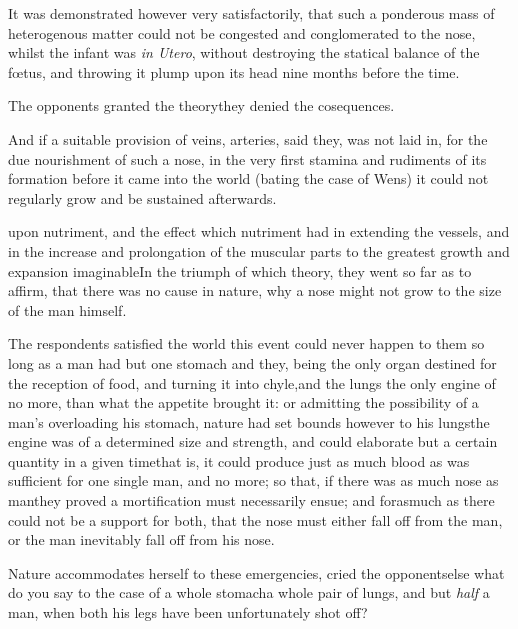 \documentclass{article}
\begin{document}
It was demonstrated however very sa\-tisfactorily, that such a ponderous mass of
heterogenous matter could not be congested and conglomerated to the
nose, whilst the infant was \textit{in Utero}, without destroying the
statical balance of the\break
fœtus, and throwing it plump upon its
head nine months before the time.\tsh

\tsk The opponents granted the theory\tsk\break they
denied the co\sic sequences.

And if a suitable provision of veins, arteries, \etc said
they, was not laid in, for the due nourishment of such a nose, in
the very first stamina and rudiments of its formation  before it
came into the world (bating the case of Wens) it could not
regularly grow and be sustained afterwards.

\break upon nutriment, and the
effect which nutriment had in extending the vessels, and in the
increase and prolongation of the muscular parts to the greatest
growth and expansion imaginable\tsk In the triumph of which
theory, they went so far as to affirm, that there was no cause
in nature, why a nose might not grow to the size of the
man himself.

The respondents satisfied the world this event could never
happen to them so long as a man had but one stomach and
they, being the
only organ destined for the reception of food, and turning
it into chyle,\tsk and the lungs the only engine of
no more, than
what the appetite brought it: or admitting the possibility
of a man’s overloading his stomach, nature had set bounds
however to his lungs\tsk the engine was of a determined size
and strength, and could elaborate but a certain quantity in
a given time\tsk that is, it could produce just as much
blood as was sufficient for one single man, and no more; so
that, if there was as much nose as man\tsk they proved a
mortification must necessarily ensue; and forasmuch as there
could not be a support for both, that the nose must either
fall off from the man, or the man inevitably fall off from
his nose.

Nature accommodates herself to these emergencies, cried the
opponents\tsk else what do you say to the case of a whole
stomach\tsk a whole pair of lungs, and but \textit{half} a man, when both
his legs have been unfortunately shot off?\tsk
\end{document}

